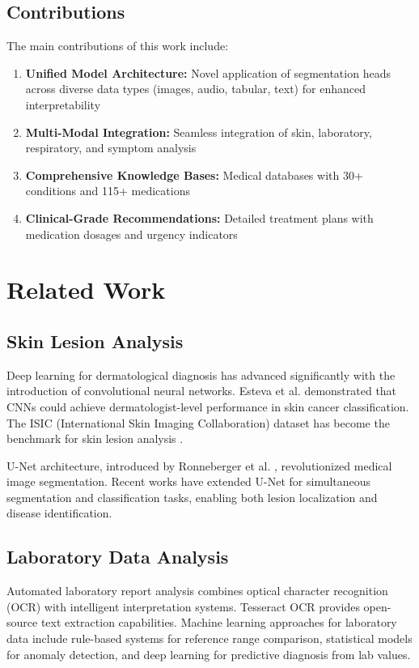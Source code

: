 \documentclass[conference]{IEEEtran}
\begin{document}
\subsection{Contributions}

The main contributions of this work include:

\begin{enumerate}
\item \textbf{Unified Model Architecture:} Novel application of segmentation heads across diverse data types (images, audio, tabular, text) for enhanced interpretability
\item \textbf{Multi-Modal Integration:} Seamless integration of skin, laboratory, respiratory, and symptom analysis
\item \textbf{Comprehensive Knowledge Bases:} Medical databases with 30+ conditions and 115+ medications
\item \textbf{Clinical-Grade Recommendations:} Detailed treatment plans with medication dosages and urgency indicators
\end{enumerate}

\section{Related Work}

\subsection{Skin Lesion Analysis}

Deep learning for dermatological diagnosis has advanced significantly with the introduction of convolutional neural networks. Esteva et al. \cite{esteva2017dermatologist} demonstrated that CNNs could achieve dermatologist-level performance in skin cancer classification. The ISIC (International Skin Imaging Collaboration) dataset has become the benchmark for skin lesion analysis \cite{codella2017skin}.

U-Net architecture, introduced by Ronneberger et al. \cite{ronneberger2015u}, revolutionized medical image segmentation. Recent works have extended U-Net for simultaneous segmentation and classification tasks, enabling both lesion localization and disease identification.

\subsection{Laboratory Data Analysis}

Automated laboratory report analysis combines optical character recognition (OCR) with intelligent interpretation systems. Tesseract OCR \cite{smith2007overview} provides open-source text extraction capabilities. Machine learning approaches for laboratory data include rule-based systems for reference range comparison, statistical models for anomaly detection, and deep learning for predictive diagnosis from lab values.
\end{document}
